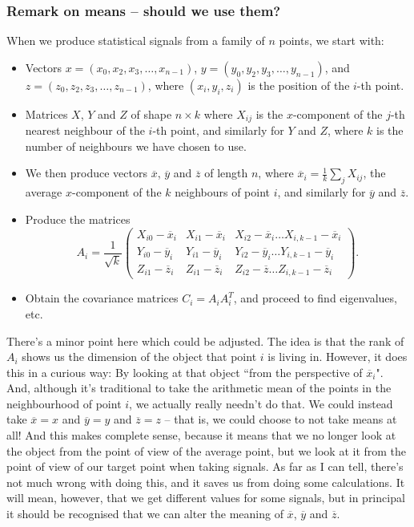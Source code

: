 \documentclass[a4paper,11pt,twoside]{article}
\theoremstyle{definition}
\theoremstyle{remark}
\begin{document}
\subsubsection{Remark on means -- should we use them?}
When we produce statistical signals from a family of $n$ points, we start with:
\begin{itemize}
\item Vectors $x=(x_0,x_2,x_3,\dots,x_{n-1})$, $y=(y_0,y_2,y_3,\dots,y_{n-1})$, and $z=(z_0,z_2,z_3,\dots,z_{n-1})$, where $(x_i,y_i,z_i)$ is the position of the $i$-th point.
\item Matrices $X$, $Y$ and $Z$ of shape $n\times k$ where $X_{ij}$ is the $x$-component of the $j$-th nearest neighbour of the $i$-th point, and similarly for $Y$ and $Z$, where $k$ is the number of neighbours we have chosen to use.
\item We then produce vectors $\overline x$, $\overline y$ and $\overline z$ of length $n$, where $\overline x_i=\frac{1}{k}\sum_{j}X_{ij}$, the average $x$-component of the $k$ neighbours of point $i$, and similarly for $\overline y$ and $\overline z$.
\item Produce the matrices
\begin{displaymath}
A_i=\frac{1}{\sqrt{k}}
\begin{pmatrix}
X_{i0}-\overline x_i& X_{i1}-\overline x_i&X_{i2}-\overline x_i\dots X_{i,k-1}-\overline x_i\\
Y_{i0}-\overline y_i& Y_{i1}-\overline y_i&Y_{i2}-\overline y_i\dots Y_{i,k-1}-\overline y_i\\
Z_{i1}-\overline z_i& Z_{i1}-\overline z_i&Z_{i2}-\overline z\dots Z_{i,k-1}-\overline z_i
\end{pmatrix}.
\end{displaymath}
\item Obtain the covariance matrices $C_i=A_iA_i^T$, and proceed to find eigenvalues, etc.
\end{itemize}
There's a minor point here which could be adjusted. The idea is that the rank of $A_i$ shows us the dimension of the object that point $i$ is living in. However, it does this in a curious way: By looking at that object ``from the perspective of $\overline x_i$". And, although it's traditional to take the arithmetic mean of the points in the neighbourhood of point $i$, we actually really needn't do that. We could instead take $\overline x = x$ and $\overline y=y$ and $\overline z = z$ -- that is, we could choose to not take means at all! And this makes complete sense, because it means that we no longer look at the object from the point of view of the average point, but we look at it from the point of view of our target point when taking signals. As far as I can tell, there's not much wrong with doing this, and it saves us from doing some calculations. It will mean, however, that we get different values for some signals, but in principal it should be recognised that we can alter the meaning of $\overline x$, $\overline y$ and $\overline z$. 
\end{document}
